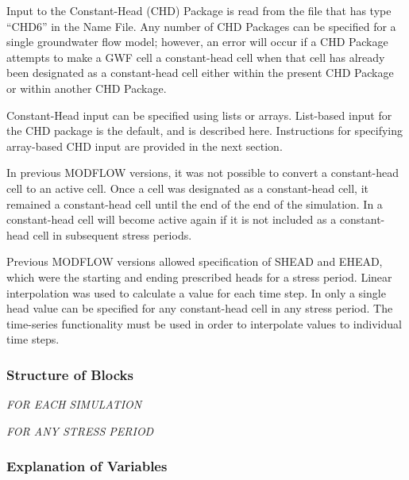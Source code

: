 
Input to the Constant-Head (CHD) Package is read from the file that has type ``CHD6'' in the Name File.  Any number of CHD Packages can be specified for a single groundwater flow model; however, an error will occur if a CHD Package attempts to make a GWF cell a constant-head cell when that cell has already been designated as a constant-head cell either within the present CHD Package or within another CHD Package.

Constant-Head input can be specified using lists or arrays.  List-based input for the CHD package is the default, and is described here.  Instructions for specifying array-based CHD input are provided in the next section.

In previous MODFLOW versions, it was not possible to convert a constant-head cell to an active cell.  Once a cell was designated as a constant-head cell, it remained a constant-head cell until the end of the end of the simulation.  In \mf a constant-head cell will become active again if it is not included as a constant-head cell in subsequent stress periods.

Previous MODFLOW versions allowed specification of SHEAD and EHEAD, which were the starting and ending prescribed heads for a stress period.  Linear interpolation was used to calculate a value for each time step.  In \mf only a single head value can be specified for any constant-head cell in any stress period.  The time-series functionality must be used in order to interpolate values to individual time steps.  

\vspace{5mm}
\subsubsection{Structure of Blocks}
\vspace{5mm}

\noindent \textit{FOR EACH SIMULATION}


\vspace{5mm}
\noindent \textit{FOR ANY STRESS PERIOD}

\packageperioddescription

\vspace{5mm}
\subsubsection{Explanation of Variables}
\begin{description}

\end{description}

